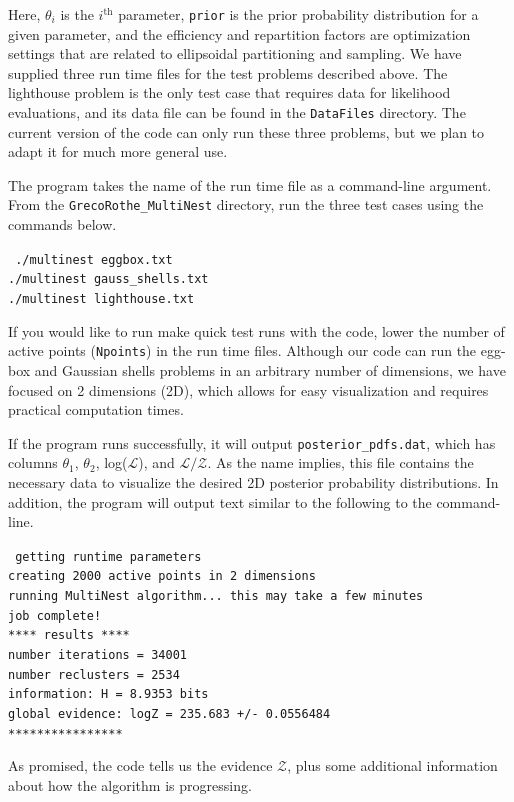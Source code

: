 \documentclass{article}
\def\mrm{\mathrm}
\begin{document}
\noindent Here, $\theta_i$ is the $i^\mrm{th}$ parameter, {\tt prior} is the prior probability distribution for a given parameter, and the efficiency and repartition factors are optimization settings that are related to ellipsoidal partitioning and sampling. We have supplied three run time files for the test problems described above. The lighthouse problem is the only test case that requires data for likelihood evaluations, and its data file can be found in the {\tt DataFiles} directory. The current version of the code can only run these three problems, but we plan to adapt it for much more general use. 

The program takes the name of the run time file as a command-line argument. From the {\tt GrecoRothe\_MultiNest} directory, run the three test cases using the commands below.

\begin{adjustwidth*}{3.6cm}{3.5cm}
 {\tt 
 ./multinest eggbox.txt\\
./multinest gauss\_shells.txt\\
 ./multinest lighthouse.txt\\
 }
 \end{adjustwidth*}
 
\noindent If you would like to run make quick test runs with the code, lower the number of active points ({\tt Npoints}) in the run time files. Although our code can run the egg-box and Gaussian shells problems in an arbitrary number of dimensions, we have focused on 2 dimensions (2D), which allows for easy visualization and requires practical computation times. 

If the program runs successfully, it will output {\tt posterior\_pdfs.dat}, which has columns  $\theta_1$, $\theta_2$, log($\mathcal{L}$), and $\mathcal{L/Z}$. As the name implies, this file contains the necessary data to visualize the desired 2D posterior probability distributions. In addition, the program will output text similar to the following to the command-line. 

\begin{adjustwidth*}{1.2cm}{1.2cm}
{\tt
getting runtime parameters\\
creating 2000 active points in 2 dimensions\\
running MultiNest algorithm... this may take a few minutes\\
job complete!\\
**** results ****\\
number iterations = 34001\\
number reclusters = 2534\\
information: H =  8.9353 bits\\
global evidence: logZ = 235.683 +/- 0.0556484\\
****************}
\end{adjustwidth*}

As promised, the code tells us the evidence $\mathcal{Z}$, plus some additional information about how the algorithm is progressing. 



\end{document}
